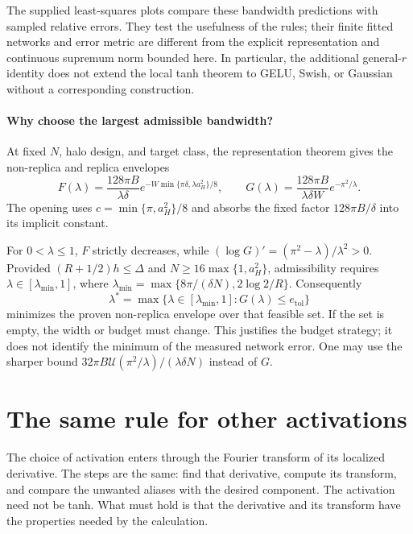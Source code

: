 \documentclass[11pt]{article}
\begin{document}
The supplied least-squares plots compare these bandwidth predictions with
sampled relative errors. They test the usefulness of the rules; their
finite fitted networks and error metric are different from the explicit
representation and continuous supremum norm bounded here. In particular,
the additional general-$r$ identity does not extend the local tanh theorem
to GELU, Swish, or Gaussian without a corresponding construction.

\paragraph{Why choose the largest admissible bandwidth?}
At fixed $N$, halo design, and target class, the representation theorem gives
the non-replica and replica envelopes
\begin{equation}
 F(\lambda)=\frac{128\pi B}{\lambda\delta}
 e^{-W\min\{\pi\delta,\lambda a_H^2\}/8},\qquad
 G(\lambda)=\frac{128\pi B}{\lambda\delta W}e^{-\pi^2/\lambda}.
 \label{eq:lambda-budget-envelopes}
\end{equation}
The opening uses $c=\min\{\pi,a_H^2\}/8$ and absorbs the fixed factor $128\pi B/\delta$ into its implicit constant.

For $0<\lambda\le1$, $F$ strictly decreases, while
$(\log G)'=(\pi^2-\lambda)/\lambda^2>0$.
Provided $(R+1/2)h\le\Delta$ and $N\ge16\max\{1,a_H^2\}$, admissibility requires
$\lambda\in[\lambda_{\min},1]$, where
$\lambda_{\min}=\max\{8\pi/(\delta N),2\log2/R\}$.
Consequently
\[
 \lambda^*=\max\{\lambda\in[\lambda_{\min},1]:
                  G(\lambda)\le e_{\mathrm{tol}}\}
\]
minimizes the proven non-replica envelope over that feasible set. If the
set is empty, the width or budget must change. This justifies the budget
strategy; it does not identify the minimum of the measured network error.
One may use the sharper bound
$32\pi B\mathcal U(\pi^2/\lambda)/(\lambda\delta N)$ instead of $G$.



\clearpage
\section{The same rule for other activations}
\label{app:general-activation}
\setcounter{equation}{0}
\renewcommand{\theequation}{B.\arabic{equation}}
\renewcommand{\theHequation}{appendixB.\arabic{equation}}

The choice of activation enters through the Fourier transform of its localized
derivative. The steps are the same: find that derivative, compute its
transform, and compare the unwanted aliases with the desired component.
The activation need not be tanh. What must hold is that the derivative and
its transform have the properties needed by the calculation.
\end{document}
